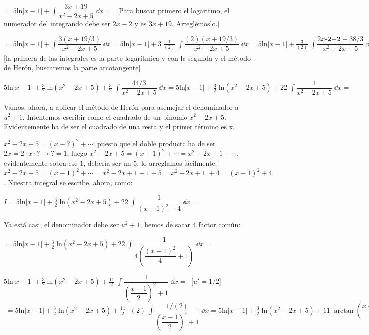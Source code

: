 {\begin{ejem}
$=\displaystyle 5 \mathrm{ln}|x-1|+\int \dfrac {3x+19}{x^2-2x+5}\; \dd x=\; $ [Para buscar primero el logaritmo, el numerador del integrando debe ser $2x-2$ y es $3x+19$. Arreglémoslo.]

$=\displaystyle 5 \mathrm{ln}|x-1|+\int \dfrac {3(x+19/3)}{x^2-2x+5} \; \dd x= \displaystyle 5 \mathrm{ln}|x-1|+3\;\frac {1} {(2)} \;  \int \dfrac {(2)(x+19/3)}{x^2-2x+5}\; \dd x= \displaystyle 5 \mathrm{ln}|x-1|+\frac {3} {(2)}\;  \int \dfrac {2x\textbf{-2+2}+38/3}{x^2-2x+5}\; \dd x=  \displaystyle 5 \mathrm{ln}|x-1|+\frac {3} {2}\; 
\left(  \int \dfrac {2x-2}{x^2-2x+5}\; \dd x + \int \dfrac {44/3}{x^2-2x+5}\; \dd x \right) =\; $  [la primera de las integrales es la parte logarítmica y con la segunda y el método de Herón, buscaremos la parte arcotangente]

$\displaystyle 5 \mathrm{ln}|x-1|+\frac {3} {2}\; 
 \mathrm{ln}(x^2-2x+5) + \frac {3} {2}\; \int \dfrac {44/3}{x^2-2x+5}\; \dd x  = \displaystyle 5 \mathrm{ln}|x-1|+\frac {3} {2}\; 
 \mathrm{ln}(x^2-2x+5) + 22\; \int \dfrac {1}{x^2-2x+5}\; \dd x  =\; $ 
 
 Vamos, ahora, a aplicar el método de Herón para asemejar el denominador a $u^2+1$. Intentemos escribir como el cuadrado de un binomio $x^2-2x+5$. Evidentemente ha de ser el cuadrado de una resta y el primer término es x.
 
$x^2-2x+5=(x-\boxed{?} )^2+\cdots$; puesto que el doble producto ha de ser $2x=2\cdot x \cdot \boxed{?} \to \boxed{?}=1$, luego
$x^2-2x+5=(x-1)^2+\cdots= x^2-2x +1 +\cdots $, evidentemente	 sobra ese $1$, debería ser un $5$, lo arreglamos fácilmente: 
$x^2-2x+5=(x-1)^2+\cdots= x^2-2x +1 -1 +5 =x^2-2x+1 \; +4 = (x-1)^2 +4$. Nuestra integral se escribe, ahora, como:

$I= \displaystyle 5 \mathrm{ln}|x-1|+\frac {3} {2}\; 
 \mathrm{ln}(x^2-2x+5) + 22\; \int \dfrac {1}{(x-1)^2+4}\; \dd x  =\;$
 
 Ya está casi, el denominador debe ser $u^2+1$, hemos de sacar $4$ factor común:
 
$=\displaystyle 5 \mathrm{ln}|x-1|+\frac {3} {2}\; 
 \mathrm{ln}(x^2-2x+5) + 22\; \int \dfrac {1}{4\left( \dfrac {(x-1)^2}{4}+1\right) }\; \dd x  =\;$ 
 
 $\displaystyle 5 \mathrm{ln}|x-1|+\frac {3} {2}\; 
 \mathrm{ln}(x^2-2x+5) + \frac {11}{2}\; \int 
 \dfrac {1}
 { \left(\dfrac {x-1}{2}  \right)^2 + 1} \; \dd x  =\;$ [$u'=1/2$] $\; = \displaystyle 5 \mathrm{ln}|x-1|+\frac {3} {2}\; 
 \mathrm{ln}(x^2-2x+5) + \frac {11}{2} \cdot (2)\; \int 
 \dfrac {1/(2)}
 { \left(\dfrac {x-1}{2}  \right)^2 + 1} \; \dd x  = \displaystyle 5 \mathrm{ln}|x-1|+\frac {3} {2}\; 
 \mathrm{ln}(x^2-2x+5) + 11	\; \arctan \left( \dfrac  {x-1}{2} \right) + \mathcal C$
 


\end{ejem}}

